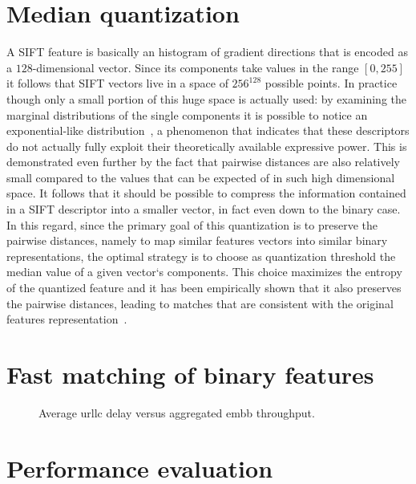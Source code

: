 \documentclass[a4paper, 11pt, oneside]{article}
\newlength\fheight
\newlength\fwidth
\begin{document}
  \section*{Median quantization}
  A SIFT feature is basically an histogram of gradient directions that is encoded as a $128$-dimensional vector. Since its components take values in the range $[0, 255]$ it follows that SIFT vectors live in a space of $256^{128}$ possible points. In practice though only a small portion of this huge space is actually used: by examining the marginal distributions of the single components it is possible to notice an exponential-like distribution~\cite{peker2011binary}, a phenomenon that indicates that these descriptors do not actually fully exploit their theoretically available expressive power. This is demonstrated even further by the fact that pairwise distances are also relatively small compared to the values that can be expected of in such high dimensional space. It follows that it should be possible to compress the information contained in a SIFT descriptor into a smaller vector, in fact even down to the binary case. In this regard, since the primary goal of this quantization is to preserve the pairwise distances, namely to map similar features vectors into similar binary representations, the optimal strategy is to choose as quantization threshold the median value of a given vector`s components. This choice maximizes the entropy of the quantized feature and it has been empirically shown that it also preserves the pairwise distances, leading to matches that are consistent with the original features representation~\cite{peker2011binary}.
  
    \section*{Fast matching of binary features}
    
\begin{figure}
  \centering
    \setlength{}
    \setlength{}
    
    \setlength\belowcaptionskip{-.3cm}
    \caption{Average \gls{urllc} delay versus aggregated \gls{embb} throughput.}
    \label{Fig:t_d_versus_numEmbbUes}
\end{figure}    
    
    \section*{Performance evaluation}



\end{document}
